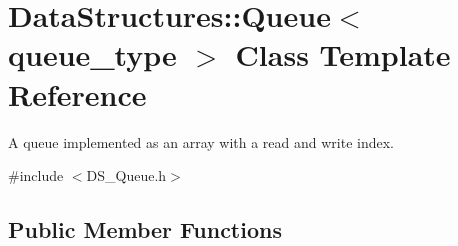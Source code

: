 \hypertarget{class_data_structures_1_1_queue}{\section{Data\-Structures\-:\-:Queue$<$ queue\-\_\-type $>$ Class Template Reference}
\label{class_data_structures_1_1_queue}
}


A queue implemented as an array with a read and write index.  




{\ttfamily \#include $<$D\-S\-\_\-\-Queue.\-h$>$}

\subsection*{Public Member Functions}
